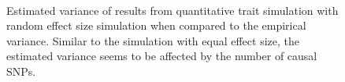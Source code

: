 \begin{figure}
{				\label{fig:gctaQtRandVarCom}
			}\\
			\caption[Quantitative Trait with Random Effect Size Simulation Result(Estimated Variance)]
			{Estimated variance of results from quantitative trait simulation with random effect size simulation when compared to the empirical variance.
				Similar to the simulation with equal effect size, the estimated variance seems to be affected by the number of causal \glspl{SNP}.
				} 
			\label{fig:QtRandVarCom}
		\end{figure}